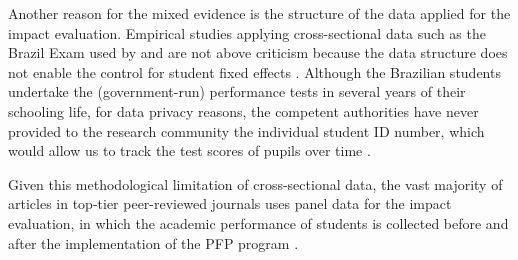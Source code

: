 \documentclass[a4paper, 12pt]{article}
\begin{document}










Another reason for the mixed evidence is the structure of the data applied for the impact evaluation. Empirical studies applying cross-sectional data \textemdash such as the Brazil Exam used by \citet{lepine2016teacher} and \citet{oshiro2015impacto} \textemdash are not above criticism because the data structure does not enable the control for student fixed effects \citep{loeb2000examining}. Although the Brazilian students undertake the (government-run) performance tests in several years of their schooling life, for data privacy reasons, the competent authorities have never provided to the research community the individual student ID number, which would allow us to track the test scores of pupils over time \citep{brooke2011geres}. 






Given this methodological limitation of cross-sectional data, the vast majority of articles in top-tier peer-reviewed journals uses panel data for the impact evaluation, in which the academic performance of students is collected before and after the implementation of the PFP program \citep[see e.g.][]{loyalka2019pay,barrera2017teacher, britton2016teacher, behrman2015aligning, dee2015incentives, imberman2015incentive, yuan2013incentive, lavy2009performance}.
\end{document}
